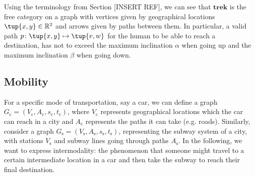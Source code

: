 

Using the terminology from Section [INSERT REF], we can see that $\mathbf{trek}$ is the free category on a graph with vertices given by geographical locations $\tup{x,y}\in \mathbb{R}^2$ and arrows given by paths between them. In particular, a valid path $p\colon \tup{x,y}\mapsto \tup{v,w}$ for the human to be able to reach a destination, has not to exceed the maximum inclination $\alpha$ when going up and the maximum inclination $\beta$ when going down.


\subsection{Mobility}

For a specific mode of transportation, say a car, we can define a graph $G_\mathrm{c}=(V_\mathrm{c},A_\mathrm{c},s_\mathrm{c},t_\mathrm{c})$, where $V_\mathrm{c}$ represents geographical locations which the car can reach in a city and $A_\mathrm{c}$ represents the paths it can take (e.g. roads). Similarly, consider a graph $G_\mathrm{s}=(V_\mathrm{s},A_\mathrm{s},s_\mathrm{s},t_\mathrm{s})$, representing the subway system of a city, with stations $V_\mathrm{s}$ and subway lines going through paths $A_\mathrm{s}$. In the following, we want to express intermodality: the phenomenon that someone might travel to a certain intermediate location in a car and then take the subway to reach their final destination. 



